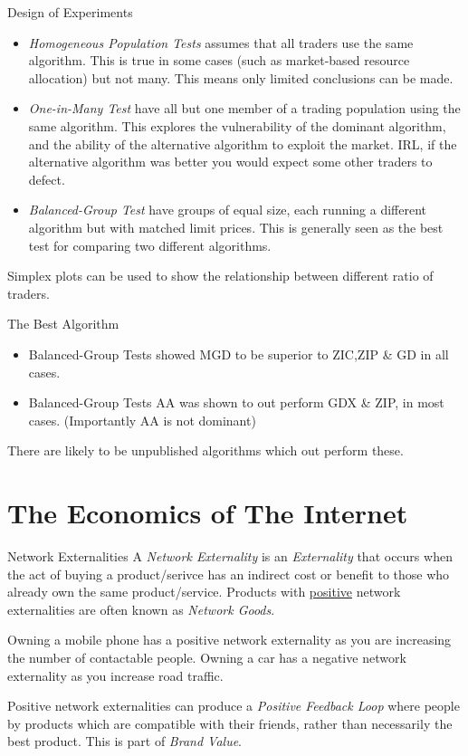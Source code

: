 \documentclass[11pt,a4paper]{article}
\begin{document}
\begin{proposition}{Design of Experiments}
  \begin{itemize}
    \item \textit{Homogeneous Population Tests} assumes that all traders use the same algorithm. This is true in some cases (such as market-based resource allocation) but not many. This means only limited conclusions can be made.
    \item \textit{One-in-Many Test} have all but one member of a trading population using the same algorithm. This explores the vulnerability of the dominant algorithm, and the ability of the alternative algorithm to exploit the market. IRL, if the alternative algorithm was better you would expect some other traders to defect.
    \item \textit{Balanced-Group Test} have groups of equal size, each running a different algorithm but with matched limit prices. This is generally seen as the best test for comparing two different algorithms.
  \end{itemize}
  Simplex plots can be used to show the relationship between different ratio of traders.
\end{proposition}

\begin{remark}{The Best Algorithm}
  \begin{itemize}
    \item Balanced-Group Tests showed MGD to be superior to ZIC,ZIP \& GD in all cases.
    \item Balanced-Group Tests AA was shown to out perform GDX \& ZIP, in most cases. (Importantly AA is not dominant)
  \end{itemize}
  There are likely to be unpublished algorithms which out perform these.
\end{remark}

\section{The Economics of The Internet}

\begin{definition}{Network Externalities}
  A \textit{Network Externality} is an \textit{Externality} that occurs when the act of buying a product/serivce has an indirect cost or benefit to those who already own the same product/service. Products with \underline{positive} network externalities are often known as \textit{Network Goods}.

  \par Owning a mobile phone has a positive network externality as you are increasing the number of contactable people. Owning a car has a negative network externality as you increase road traffic.

  \par Positive network externalities can produce a \textit{Positive Feedback Loop} where people by products which are compatible with their friends, rather than necessarily the best product. This is part of \textit{Brand Value}.
\end{definition}
\end{document}
